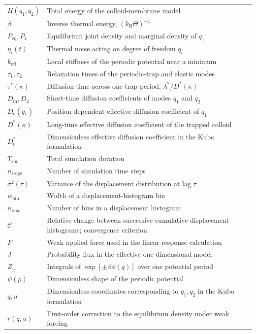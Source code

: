 \begin{longtable}{p{3cm}p{11cm}}
$H(q_1,q_2)$ & Total energy of the colloid-membrane model \\
$\beta$ & Inverse thermal energy, $(k_\mathrm{B}\Theta)^{-1}$ \\
$P_\mathrm{eq},P_1$ & Equilibrium joint density and marginal density of $q_1$ \\
$\eta_i(t)$ & Thermal noise acting on degree of freedom $q_i$ \\
$k_\mathrm{eff}$ & Local stiffness of the periodic potential near a minimum \\
$\tau_1,\tau_2$ & Relaxation times of the periodic-trap and elastic modes \\
$\tau^*(\kappa)$ & Diffusion time across one trap period, $\lambda^2/D^*(\kappa)$ \\
$D_\mathrm{m},D_2$ & Short-time diffusion coefficients of modes $q_1$ and $q_2$ \\
$D_\mathrm{e}(q_1)$ & Position-dependent effective diffusion coefficient of $q_1$ \\
$D^*(\kappa)$ & Long-time effective diffusion coefficient of the trapped colloid \\
$D_\mathrm{q}^*$ & Dimensionless effective diffusion coefficient in the Kubo formulation \\
$T_\mathrm{sim}$ & Total simulation duration \\
$n_\mathrm{steps}$ & Number of simulation time steps \\
$\sigma^2(\tau)$ & Variance of the displacement distribution at lag $\tau$ \\
$w_\mathrm{bin}$ & Width of a displacement-histogram bin \\
$n_\mathrm{bins}$ & Number of bins in a displacement histogram \\
$\mathcal C$ & Relative change between successive cumulative displacement histograms; convergence criterion \\
$F$ & Weak applied force used in the linear-response calculation \\
$J$ & Probability flux in the effective one-dimensional model \\
$Z_\pm$ & Integrals of $\exp[\pm\beta\phi(q)]$ over one potential period \\
$\psi(p)$ & Dimensionless shape of the periodic potential \\
$q,u$ & Dimensionless coordinates corresponding to $q_1,q_2$ in the Kubo formulation \\
$r(q,u)$ & First-order correction to the equilibrium density under weak forcing \\

\end{longtable}
